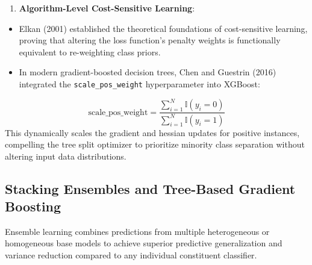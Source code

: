 \documentclass[12pt,a4paper,oneside]{report}
\begin{document}
\begin{enumerate}[leftmargin=0.35in]
\item \textbf{Algorithm-Level Cost-Sensitive Learning}:
\end{enumerate}
\begin{itemize}[leftmargin=0.35in]
\item Elkan (2001) established the theoretical foundations of cost-sensitive learning, proving that altering the loss function's penalty weights is functionally equivalent to re-weighting class priors.
\item In modern gradient-boosted decision trees, Chen and Guestrin (2016) integrated the \texttt{scale\_pos\_weight} hyperparameter into XGBoost:
\end{itemize}
\begin{equation}
\text{scale\_pos\_weight} = \frac{\sum_{i=1}^N \mathbb{I}(y_i = 0)}{\sum_{i=1}^N \mathbb{I}(y_i = 1)}
\end{equation}
This dynamically scales the gradient and hessian updates for positive instances, compelling the tree split optimizer to prioritize minority class separation without altering input data distributions.


\subsection{Stacking Ensembles and Tree-Based Gradient Boosting}

Ensemble learning combines predictions from multiple heterogeneous or homogeneous base models to achieve superior predictive generalization and variance reduction compared to any individual constituent classifier.
\end{document}
